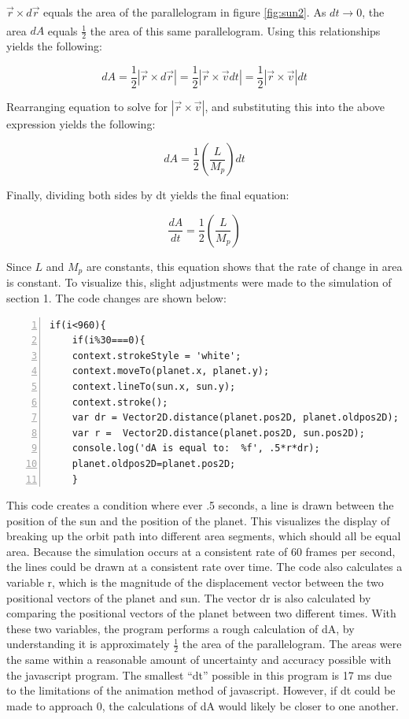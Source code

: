 $\vec{r} \times d\vec{r}$ equals the area of the parallelogram in figure \ref{fig:sun2}.  As $dt \rightarrow  0$, the area $dA$ equals $\frac{1}{2}$ the area of this same parallelogram.\textsuperscript{\cite{klepner}}  Using this relationships yields the following:

$$ dA = \frac{1}{2}|\vec{r} \times d\vec{r}| = \frac{1}{2}\left|\vec{r} \times \vec{v} dt \right| = \frac{1}{2}\left|\vec{r} \times \vec{v}\right| dt  $$

Rearranging equation  to solve for $\left|\vec{r} \times \vec{v}\right|$, and substituting this into the above expression yields the following:

$$ dA = \frac{1}{2}\left(\frac{L}{M_p}\right)dt  $$

Finally, dividing both sides by dt yields the final equation:

\begin{equation}\label{dadt}
\frac{dA}{dt} = \frac{1}{2}\left(\frac{L}{M_p}\right)
\end{equation}

Since $L$ and $M_p$ are constants, this equation shows that the rate of change in area is constant.  To visualize this, slight adjustments were made to the simulation of section 1.  The code changes are shown below:



\begin{lstlisting}[breaklines=true, frame=single, numbers=left, caption=Code for printing out values of speed, label=lst:changestoorbit]
if(i<960){
	if(i%30===0){
	context.strokeStyle = 'white';
	context.moveTo(planet.x, planet.y);
	context.lineTo(sun.x, sun.y);
	context.stroke();
	var dr = Vector2D.distance(planet.pos2D, planet.oldpos2D);
	var r =  Vector2D.distance(planet.pos2D, sun.pos2D);
	console.log('dA is equal to:  %f', .5*r*dr);
	planet.oldpos2D=planet.pos2D;
	}
\end{lstlisting}

This code creates a condition where ever .5 seconds, a line is drawn between the position of the sun and the position of the planet.  This visualizes the display of breaking up the orbit path into different area segments, which should all be equal area.  Because the simulation occurs at a consistent rate of 60 frames per second, the lines could be drawn at a consistent rate over time.  The code also calculates a variable r, which is the magnitude of the displacement vector between the two positional vectors of the planet and sun.  The vector dr is also calculated by comparing the positional vectors of the planet between two different times.  With these two variables, the program performs a rough calculation of dA, by understanding it is approximately $\frac{1}{2}$ the area of the parallelogram.  The areas were the same within a reasonable amount of uncertainty and accuracy possible with the javascript program.  The smallest ``dt'' possible in this program is 17 ms due to the limitations of the animation method of javascript.  However, if dt could be made to approach 0, the calculations of dA would likely be closer to one another.

